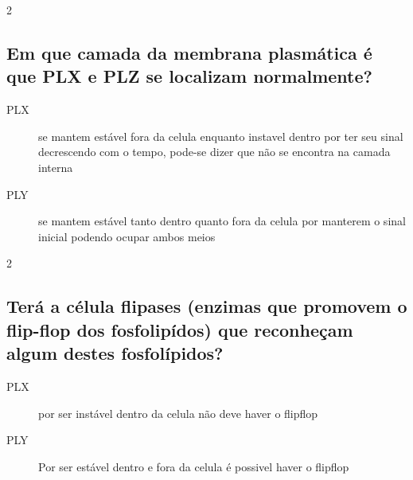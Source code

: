 \documentclass[\mainfilename]{subfiles}
\begin{document}
\begin{questionBox}2{} %
    
    \subsection*{Em que camada da membrana plasmática é que PLX e PLZ se localizam normalmente?}

    \begin{answerBox}{} %
        \begin{description}
            \item[PLX] se mantem estável fora da celula enquanto instavel dentro por ter seu sinal decrescendo com o tempo, pode-se dizer que não se encontra na camada interna
            \item[PLY] se mantem estável tanto dentro quanto fora da celula por manterem o sinal inicial podendo ocupar ambos meios
        \end{description}
    \end{answerBox}
    
\end{questionBox}

\begin{questionBox}2{} %
    
    \subsection*{Terá a célula flipases (enzimas que promovem o flip-flop dos fosfolipídos) que reconheçam algum destes fosfolípidos?}

    \begin{answerBox}{} %
        \begin{description}
            \item[PLX] por ser instável dentro da celula não deve haver o flipflop
            \item[PLY] Por ser estável dentro e fora da celula é possivel haver o flipflop
        \end{description}
    \end{answerBox}
    
\end{questionBox}
\end{document}
